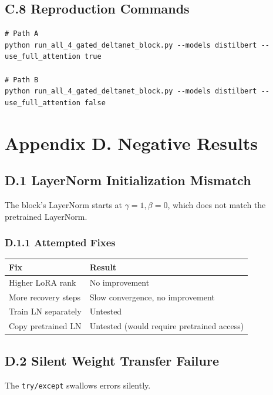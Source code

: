 \subsection{C.8 Reproduction Commands}

\begin{lstlisting}
# Path A
python run_all_4_gated_deltanet_block.py --models distilbert --use_full_attention true

# Path B
python run_all_4_gated_deltanet_block.py --models distilbert --use_full_attention false
\end{lstlisting}




\section{Appendix D. Negative Results}

\subsection{D.1 LayerNorm Initialization Mismatch}

The block's LayerNorm starts at $\gamma = 1, \beta = 0$, which does not 
match the pretrained LayerNorm.

\subsubsection{D.1.1 Attempted Fixes}

\begin{table}[H]
\centering
\small
\begin{tabular}{ll}
\toprule
\textbf{Fix} & \textbf{Result} \\
\midrule
Higher LoRA rank & No improvement \\
More recovery steps & Slow convergence, no improvement \\
Train LN separately & Untested \\
Copy pretrained LN & Untested (would require pretrained access) \\
\bottomrule
\end{tabular}
\end{table}

\subsection{D.2 Silent Weight Transfer Failure}

The \texttt{try/except} swallows errors silently.

